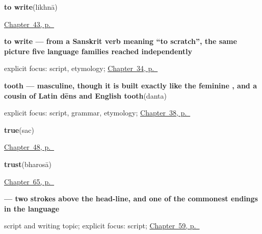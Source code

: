\noindent\begin{minipage}[t]{\linewidth}
\raggedright
\textbf{to write}\enspace\emph{}\enspace(likhnā)\par
\footnotesize \hyperref[ch:hi-see-say]{Chapter~43, p.~\pageref*{ch:hi-see-say}}
\end{minipage}\par\smallskip

\noindent\begin{minipage}[t]{\linewidth}
\raggedright
\textbf{to write — from a Sanskrit verb meaning \textquotedblleft{}to scratch\textquotedblright{}, the same picture five language families reached independently}\enspace\emph{}\par
\footnotesize explicit focus: script, etymology; \hyperref[ch:hi-verbs-of-the-mind]{Chapter~34, p.~\pageref*{ch:hi-verbs-of-the-mind}}
\end{minipage}\par\smallskip

\noindent\begin{minipage}[t]{\linewidth}
\raggedright
\textbf{tooth — masculine, though it is built exactly like the feminine , and a cousin of Latin dēns and English tooth}\enspace\emph{}\enspace(danta)\par
\footnotesize explicit focus: script, grammar, etymology; \hyperref[ch:hi-where-it-hurts]{Chapter~38, p.~\pageref*{ch:hi-where-it-hurts}}
\end{minipage}\par\smallskip

\noindent\begin{minipage}[t]{\linewidth}
\raggedright
\textbf{true}\enspace\emph{}\enspace(sac)\par
\footnotesize \hyperref[ch:hi-replies]{Chapter~48, p.~\pageref*{ch:hi-replies}}
\end{minipage}\par\smallskip

\noindent\begin{minipage}[t]{\linewidth}
\raggedright
\textbf{trust}\enspace\emph{}\enspace(bharosā)\par
\footnotesize \hyperref[ch:hi-asking-nicely]{Chapter~65, p.~\pageref*{ch:hi-asking-nicely}}
\end{minipage}\par\smallskip

\noindent\begin{minipage}[t]{\linewidth}
\raggedright
\textbf{ — two strokes above the head-line, and one of the commonest endings in the language}\par
\footnotesize script and writing topic; explicit focus: script; \hyperref[ch:hi-script-second-wave]{Chapter~59, p.~\pageref*{ch:hi-script-second-wave}}
\end{minipage}\par\smallskip

